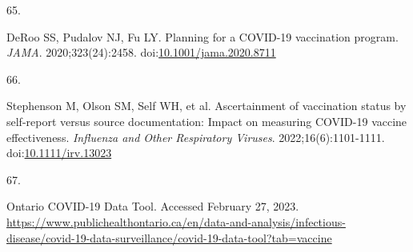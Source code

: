 \documentclass[
]{article}
\newlength{\cslhangindent}
\newlength{\csllabelwidth}
\newlength{\cslentryspacingunit} %
\newenvironment{CSLReferences}[2] %
 {%
  \setlength{\parindent}{0pt}
  \ifodd #1
  \let\oldpar\par
  \def\par{\hangindent=\cslhangindent\oldpar}
  \fi
  \setlength{\parskip}{#2\cslentryspacingunit}
 }%
 {}
\newcommand{\CSLLeftMargin}[1]{\parbox[t]{\csllabelwidth}{#1}}
\newcommand{\CSLRightInline}[1]{\parbox[t]{\linewidth - \csllabelwidth}{#1}\break}
\begin{document}
\begin{CSLReferences}{0}{0}
\leavevmode{}%
\CSLLeftMargin{65. }%
\CSLRightInline{DeRoo SS, Pudalov NJ, Fu LY. Planning for a {COVID}-19
vaccination program. \emph{{JAMA}}. 2020;323(24):2458.
doi:\href{https://doi.org/10.1001/jama.2020.8711}{10.1001/jama.2020.8711}}

\leavevmode{}%
\CSLLeftMargin{66. }%
\CSLRightInline{Stephenson M, Olson SM, Self WH, et al. Ascertainment of
vaccination status by self-report versus source documentation: Impact on
measuring {COVID}-19 vaccine effectiveness. \emph{Influenza and Other
Respiratory Viruses}. 2022;16(6):1101-1111.
doi:\href{https://doi.org/10.1111/irv.13023}{10.1111/irv.13023}}

\leavevmode{}%
\CSLLeftMargin{67. }%
\CSLRightInline{{Ontario COVID-19 Data Tool}. Accessed February 27,
2023.
\url{https://www.publichealthontario.ca/en/data-and-analysis/infectious-disease/covid-19-data-surveillance/covid-19-data-tool?tab=vaccine}}

\end{CSLReferences}
\end{document}
